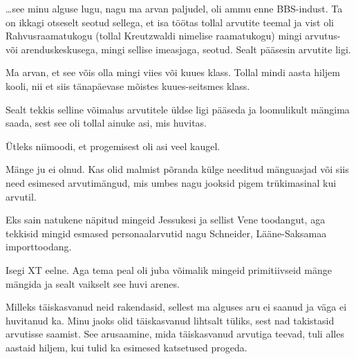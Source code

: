 
                 
\ldots see minu alguse lugu, nagu ma arvan paljudel, oli ammu enne 
BBS-indust. Ta on ikkagi otseselt  seotud sellega, et isa töötas tollal arvutite 
teemal ja vist oli Rahvusraamatukogu (tollal  
Kreutzwaldi nimelise raamatukogu) mingi arvutus- või arenduskeskusega, mingi 
sellise imeasjaga, seotud. Sealt pääsesin arvutite ligi. 


Ma arvan, et see võis olla mingi viies või kuues klass. Tollal mindi aasta 
hiljem kooli, nii et siis tänapäevase mõistes kuues-seitsmes klass. 

Sealt tekkis selline võimalus arvutitele üldse ligi pääseda ja loomulikult 
mängima saada, sest see oli tollal  ainuke asi, mis huvitas.


Ütleks niimoodi, et progemisest oli asi veel kaugel.

Mänge ju ei olnud. Kas olid malmist põranda külge needitud mänguasjad või siis 
need esimesed arvutimängud, mis  umbes nagu jooksid pigem trükimasinal kui 
arvutil. 


Eks sain natukene näpitud mingeid Jessukesi ja sellist 
Vene toodangut, aga tekkisid mingid esmased personaalarvutid nagu 
Schneider, 
Lääne-Saksamaa importtoodang.


Isegi XT eelne. Aga tema peal oli juba võimalik  mingeid primitiivseid mänge 
mängida ja sealt vaikselt  see huvi arenes. 


Milleks täiskasvanud neid rakendasid, sellest  ma alguses aru ei saanud ja 
väga ei huvitanud ka. Minu jaoks olid täiskasvanud lihtsalt tüliks, sest nad 
takistasid arvutisse saamist. See arusaamine, mida täiskasvanud arvutiga 
teevad,  tuli alles  aastaid hiljem, kui tulid ka esimesed katsetused 
progeda.

